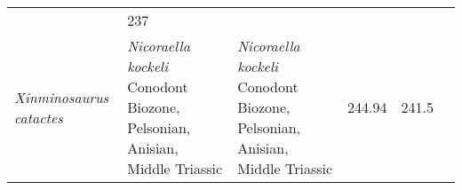 \begin{longtabu}{>{\itshape}lXXSSl}
                                                             & 237
                                                             &
                                                             \cite{Maisch1998NJGPM} \\                    
	Xinminosaurus catactes                               & \emph{Nicoraella
        kockeli} Conodont Biozone, Pelsonian, Anisian, Middle Triassic
                                                             & \emph{Nicoraella
        kockeli} Conodont Biozone, Pelsonian, Anisian, Middle Triassic
                                                             & 244.94
                                                             & 241.5
                                                             &
                                                             \cite{Jiang2008PNS} \\                     
\end{longtabu}                                        

% 
